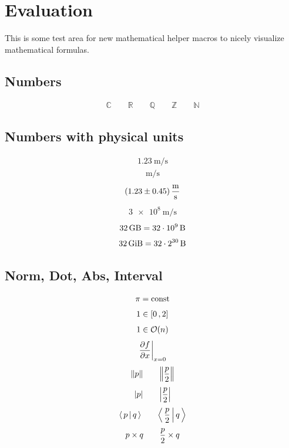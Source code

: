 
\chapter{Evaluation}
\label{chap:evaluation}

This is some test area for new mathematical helper macros to nicely visualize mathematical formulas.

\section{Numbers}
\begin{align}
    \mathbb{C}
    \qquad
    \mathbb{R}
    \qquad
    \mathbb{Q}
    \qquad
    \mathbb{Z}
    \qquad
    \mathbb{N}
\end{align}

\section{Numbers with physical units}
\begin{align}
    \SI{1.23}{\meter\per\second}
\end{align}
\begin{align}
    \si{\meter\per\second}
\end{align}
\begin{align}
    \SI{1.23\pm0.45}{\meter\per\second}
\end{align}
\begin{align}
    \SI{3e8}{\meter\per\second}
\end{align}
\begin{align}
    \SI{32}{\giga\byte} = \SI{32e9}{\byte}
\end{align}
\begin{align}
    \SI{32}{\gibi\byte} = \SI[exponent-base=2]{32e30}{\byte}
\end{align}

\section{Norm, Dot, Abs, Interval}
\begin{align}
    \pi = \mathrm{const}
\end{align}
\begin{align}
    1 \in [ 0 \,, 2 ]
\end{align}
\begin{align}
    1 \in \order{n}
\end{align}
\begin{align}
    \evalat{ \frac{\partial f}{\partial x} }{ x = 0 }
\end{align}
\begin{align}
    \norm{p} \qquad \norm{\frac{p}{2}}
\end{align}
\begin{align}
    \abs{p} \qquad \abs{\frac{p}{2}}
\end{align}
\begin{align}
    \dotproduct{p}{q} \qquad \dotproduct{\frac{p}{2}}{q}
\end{align}
\begin{align}
    p\times q \qquad \frac{p}{2}\times q
\end{align}

